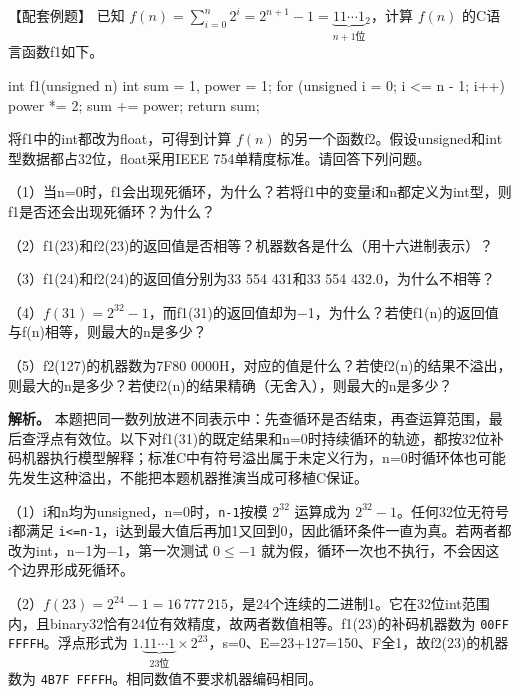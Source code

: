 \begin{example}[配套例题]

【配套例题】 已知 \(f(n)=\sum_{i=0}^{n}2^i=2^{n+1}-1=\underbrace{11\cdots1}_{n+1\text{位}}{}_2\)，计算 \(f(n)\) 的C语言函数f1如下。

\par\medskip\noindent\begin{minipage}{\linewidth}
\begin{codeblock}[language=C]
int f1(unsigned n) {
    int sum = 1, power = 1;
    for (unsigned i = 0; i <= n - 1; i++) {
        power *= 2;
        sum += power;
    }
    return sum;
}
\end{codeblock}
\end{minipage}\par\medskip

将f1中的int都改为float，可得到计算 \(f(n)\) 的另一个函数f2。假设unsigned和int型数据都占32位，float采用IEEE 754单精度标准。请回答下列问题。

（1）当n=0时，f1会出现死循环，为什么？若将f1中的变量i和n都定义为int型，则f1是否还会出现死循环？为什么？

（2）f1(23)和f2(23)的返回值是否相等？机器数各是什么（用十六进制表示）？

（3）f1(24)和f2(24)的返回值分别为33 554 431和33 554 432.0，为什么不相等？

（4）\(f(31)=2^{32}-1\)，而f1(31)的返回值却为\ensuremath{-}1，为什么？若使f1(n)的返回值与f(n)相等，则最大的n是多少？

（5）f2(127)的机器数为7F80 0000H，对应的值是什么？若使f2(n)的结果不溢出，则最大的n是多少？若使f2(n)的结果精确（无舍入），则最大的n是多少？

\end{example}

\textbf{解析。} 本题把同一数列放进不同表示中：先查循环是否结束，再查运算范围，最后查浮点有效位。以下对f1(31)的既定结果和n=0时持续循环的轨迹，都按32位补码机器执行模型解释；标准C中有符号溢出属于未定义行为，n=0时循环体也可能先发生这种溢出，不能把本题机器推演当成可移植C保证。

（1）i和n均为unsigned，n=0时，\texttt{n-1}按模 \(2^{32}\) 运算成为 \(2^{32}-1\)。任何32位无符号i都满足 \texttt{i<\allowbreak{}=\allowbreak{}n-1}，i达到最大值后再加1又回到0，因此循环条件一直为真。若两者都改为int，n\ensuremath{-}1为\ensuremath{-}1，第一次测试 \(0\le-1\) 就为假，循环一次也不执行，不会因这个边界形成死循环。

（2）\(f(23)=2^{24}-1=16\,777\,215\)，是24个连续的二进制1。它在32位int范围内，且binary32恰有24位有效精度，故两者数值相等。f1(23)的补码机器数为 \texttt{00FF FFFFH}。浮点形式为 \(1.\underbrace{11\cdots1}_{23\text{位}}\times2^{23}\)，s=0、E=23+127=150、F全1，故f2(23)的机器数为 \texttt{4B7F FFFFH}。相同数值不要求机器编码相同。

